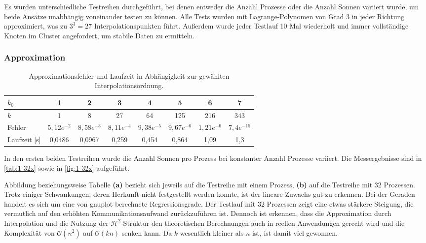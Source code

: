   Es wurden unterschiedliche Testreihen durchgeführt, bei denen entweder die Anzahl Prozesse oder die Anzahl Sonnen variiert wurde, um beide Ansätze unabhängig voneinander testen zu können.
  Alle Tests wurden mit Lagrange-Polynomen von Grad $3$ in jeder Richtung approximiert, was zu $3^3 = 27$ Interpolationspunkten führt. Außerdem wurde jeder Testlauf 10 Mal wiederholt und immer 
  vollständige Knoten im Cluster angefordert, um stabile Daten zu ermitteln.
  
  \subsubsection{Approximation}
  
  
  \begin{table}[b]
    \begin{tabular}{|l|c c c c c c c|}
    \hline
    $k_0$ & 1 & 2 & 3 & 4 & 5 & 6 & 7\\
    \hline
    $k$ & 1 & 8 & 27 & 64 & 125 & 216 & 343\\
    \hline
    Fehler & $5,12e^{-2}$ & $8,58e^{-3}$ & $8,11e^{-4}$ & $9,38e^{-5}$ & $9,67e^{-6}$ & $1,21e^{-6}$ & $7,4e^{-15}$\\
    \hline
    Laufzeit [s] & 0,0486 & 0,0967 & 0,259 & 0,454 & 0,864 & 1,09 & 1,3\\
    \hline
    \end{tabular}
    \caption{Approximationsfehler und Laufzeit in Abhängigkeit zur gewählten Interpolationsordnung.}
    \label{tab:error}
  \end{table}
  
  In den ersten beiden Testreihen wurde die Anzahl Sonnen pro Prozess bei konstanter Anzahl Prozesse variiert. Die Messergebnisse sind in \autoref{tab:1-32x} sowie in \autoref{fig:1-32x} 
  aufgeführt.
  
  Abbildung beziehungsweise Tabelle \textbf{(a)} bezieht sich jeweils auf die Testreihe mit einem Prozess, \textbf{(b)} auf die Testreihe mit 32 Prozessen. Trotz einiger Schwankungen, deren Herkunft
  nicht festgestellt werden konnte, ist der lineare Zuwachs gut zu erkennen. Bei der Geraden handelt es sich um eine von gnuplot berechnete Regressionsgrade. Der Testlauf mit $32$ Prozessen zeigt
  eine etwas stärkere Steigung, die vermutlich auf den erhöhten Kommunikationsaufwand zurückzuführen ist. Dennoch ist erkennen, dass die Approximation durch Interpolation und die Nutzung der
  $\mathcal{H}^2$-Struktur den theoretischen Berechnungen auch in reellen Anwendungen gerecht wird und die Komplexität von $\mathcal{O}(n^2)$ auf $\mathcal{O}(k n)$ senken kann. Da $k$ wesentlich 
  kleiner als $n$ ist, ist damit viel gewonnen.
  

